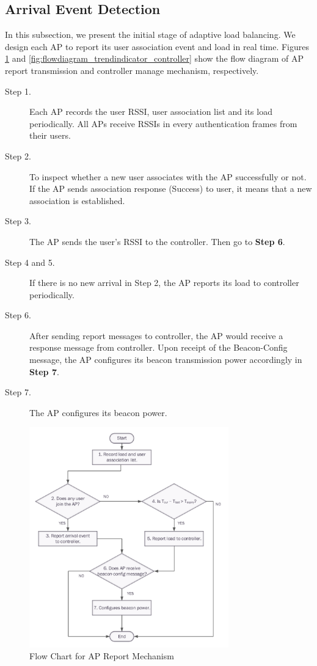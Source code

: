 \subsection{Arrival Event Detection}\label{section:3.2}
In this subsection, we present the initial stage of adaptive load balancing. We design each AP to report its user association event and load in real time. Figures \ref{fig:flowdiagram_trendindicator_ap} and \ref{fig:flowdiagram_trendindicator_controller} show the flow diagram of AP report transmission and controller manage mechanism, respectively.
\begin{description}
  \item [Step 1.] Each AP records the user RSSI, user association list and its load periodically. All APs receive RSSIs in every authentication frames from their users.
  \item [Step 2.] To inspect whether a new user associates with the AP successfully or not. If the AP sends association response (Success) to user, it means that a new association is established.
  \item [Step 3.] The AP sends the user’s RSSI to the controller. Then go to \textbf{Step 6}.
  \item [Step 4 and 5.] If there is no new arrival in Step 2, the AP reports its load to controller periodically.
  \item [Step 6.] After sending report messages to controller, the AP would receive a response message from controller. Upon receipt of the Beacon-Config message, the AP configures its beacon transmission power accordingly in \textbf{Step 7}.
  \item [Step 7.] The AP configures its beacon power.
\end{description}

\begin{figure}[tbp]
\centering
\includegraphics[width=3.4in]{images/flowdiagram_trendindicator_ap.pdf}
\caption{Flow Chart for AP Report Mechanism}
\label{fig:flowdiagram_trendindicator_ap}
\end{figure}

